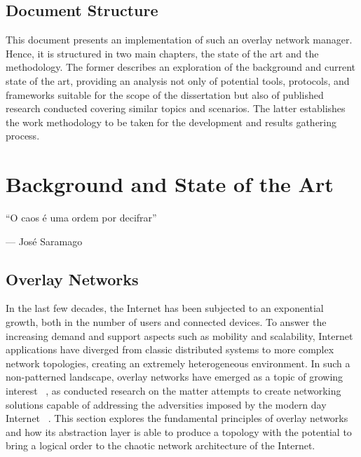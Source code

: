 \documentclass[11pt,twoside,a4paper]{report}
\begin{document}
\section{Document Structure}

This document presents an implementation of such an overlay network manager. Hence, it is structured in two main chapters, the state of the art and the methodology. The former describes an exploration of the background and current state of the art, providing an analysis not only of potential tools, protocols, and frameworks suitable for the scope of the dissertation but also of published research conducted covering similar topics and scenarios. The latter establishes the work methodology to be taken for the development and results gathering process.


\cleardoublepage

\chapter{Background and State of the Art}
\label{chapter:sota}

\begin{minipage}{80mm}
     \centering %
     ``O caos é uma ordem por decifrar''
          \begin{flushright}
          --- José Saramago
          \end{flushright}
     \end{minipage}


\section{Overlay Networks}
\label{sec:on}

In the last few decades, the Internet has been subjected to an exponential growth, both in the number of users and connected devices. To answer the increasing demand and support aspects such as mobility and scalability, Internet applications have diverged from classic distributed systems to more complex network topologies, creating an extremely heterogeneous environment. In such a non-patterned landscape, overlay networks have emerged as a topic of growing interest ~\cite{1610546}, as conducted research on the matter attempts to create networking solutions capable of addressing the adversities imposed by the modern day Internet ~\cite{jannotti2000overcast, waldvogel2003efficient}. This section explores the fundamental principles of overlay networks and how its abstraction layer is able to produce a topology with the potential to bring a logical order to  the chaotic network architecture of the Internet.
\end{document}
